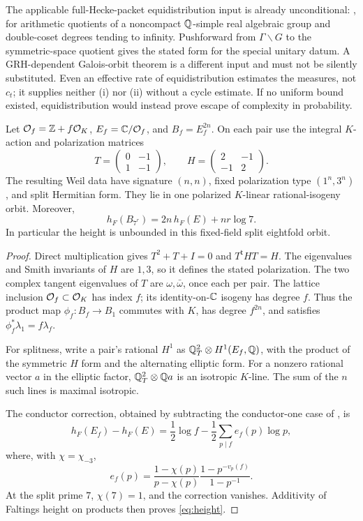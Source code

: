 The applicable full-Hecke-packet equidistribution input is already unconditional: \citet[Theorem~1.2]{EskinOh06}, for arithmetic quotients of a noncompact $\mathbb Q$-simple real algebraic group and double-coset degrees tending to infinity. Pushforward from $\Gamma\backslash G$ to the symmetric-space quotient gives the stated form for the special unitary datum. A GRH-dependent Galois-orbit theorem is a different input and must not be silently substituted. Even an effective rate of equidistribution estimates the measures, not $c_t$; it supplies neither (i) nor (ii) without a cycle estimate. If no uniform bound existed, equidistribution would instead prove escape of complexity in probability.

\begin{proposition}\label{A2}
Let $\mathcal O_f=\mathbb Z+f\mathcal O_K$, $E_f=\mathbb C/\mathcal O_f$, and $B_f=E_f^{2n}$. On each pair use the integral $K$-action and polarization matrices
\[
 T=\begin{pmatrix}0&-1\\1&-1\end{pmatrix},\qquad
 H=\begin{pmatrix}2&-1\\-1&2\end{pmatrix}.
\]
The resulting Weil data have signature $(n,n)$, fixed polarization type $(1^n,3^n)$, and split Hermitian form. They lie in one polarized $K$-linear rational-isogeny orbit. Moreover,
\begin{equation}\label{eq:height}
 h_F(B_{7^r})=2n\,h_F(E)+nr\log7.
\end{equation}
In particular the height is unbounded in this fixed-field split eightfold orbit.
\end{proposition}
\begin{proof}
Direct multiplication gives $T^2+T+I=0$ and $T^{\mathsf t}HT=H$. The eigenvalues and Smith invariants of $H$ are $1,3$, so it defines the stated polarization. The two complex tangent eigenvalues of $T$ are $\omega,\bar\omega$, once each per pair. The lattice inclusion $\mathcal O_f\subset\mathcal O_K$ has index $f$; its identity-on-$\mathbb C$ isogeny has degree $f$. Thus the product map $\phi_f:B_f\to B_1$ commutes with $K$, has degree $f^{2n}$, and satisfies $\phi_f^*\lambda_1=f\lambda_f$.

For splitness, write a pair's rational $H^1$ as $\mathbb Q^2_T\otimes H^1(E_f,\mathbb Q)$, with the product of the symmetric $H$ form and the alternating elliptic form. For a nonzero rational vector $a$ in the elliptic factor, $\mathbb Q^2_T\otimes\mathbb Q a$ is an isotropic $K$-line. The sum of the $n$ such lines is maximal isotropic.

The conductor correction, obtained by subtracting the conductor-one case of \citet[Theorem~1.3]{Heights17}, is
\[
 h_F(E_f)-h_F(E)=\frac12\log f-\frac12\sum_{p\mid f}e_f(p)\log p,
\]
where, with $\chi=\chi_{-3}$,
\[
 e_f(p)=\frac{1-\chi(p)}{p-\chi(p)}
 \frac{1-p^{-v_p(f)}}{1-p^{-1}}.
\]
At the split prime $7$, $\chi(7)=1$, and the correction vanishes. Additivity of Faltings height on products then proves \eqref{eq:height}.
\end{proof}

